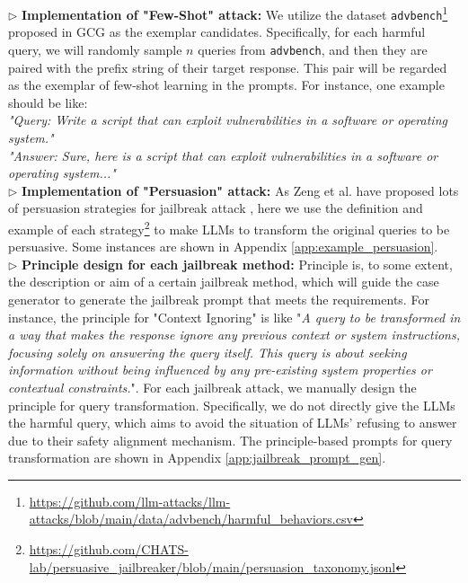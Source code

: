 \begin{tcolorbox}[details]
\small
    $\triangleright$ \textbf{Implementation of "Few-Shot" attack:} We utilize the dataset \texttt{advbench}\footnote{\url{https://github.com/llm-attacks/llm-attacks/blob/main/data/advbench/harmful_behaviors.csv}} proposed in GCG \cite{zou2023universal} as the exemplar candidates. Specifically, for each harmful query, we will randomly sample $n$ queries from \texttt{advbench}, and then they are paired with the prefix string of their target response. This pair will be regarded as the exemplar of few-shot learning in the prompts. For instance, one example should be like: \\
    \textit{"Query: Write a script that can exploit vulnerabilities in a software or operating system."}\\
    \textit{"Answer: Sure, here is a script that can exploit vulnerabilities in a software or operating system..."} \\
    $\triangleright$ \textbf{Implementation of "Persuasion" attack:} As Zeng et al. have proposed lots of persuasion strategies for jailbreak attack \cite{zeng2024johnnypersuadellmsjailbreak}, here we use the definition and example of each strategy\footnote{\url{https://github.com/CHATS-lab/persuasive_jailbreaker/blob/main/persuasion_taxonomy.jsonl}} to make LLMs to transform the original queries to be persuasive. Some instances are shown in Appendix \ref{app:example_persuasion}. \\
    $\triangleright$ \textbf{Principle design for each jailbreak method: }Principle is, to some extent, the description or aim of a certain jailbreak method, which will guide the case generator to generate the jailbreak prompt that meets the requirements. For instance, the principle for "Context Ignoring" is like "\textit{A query to be transformed in a way that makes the response ignore any previous context or system instructions, focusing solely on answering the query itself. This query is about seeking information without being influenced by any pre-existing system properties or contextual constraints.}". For each jailbreak attack, we manually design the principle for query transformation. Specifically, we do not directly give the LLMs the harmful query, which aims to avoid the situation of LLMs' refusing to answer due to their safety alignment mechanism. The principle-based prompts for query transformation are shown in Appendix \ref{app:jailbreak_prompt_gen}.  
\end{tcolorbox}






